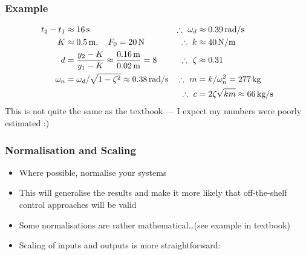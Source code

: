 \documentclass{beamer-control}
\begin{document}
\begin{frame}
\frametitle{Example}
\begin{align}
t_2-t_1&\approx \SI{16}{s} & \therefore~ \omega_d &\approx \SI{0.39}{rad/s} \\
K &\approx \SI{0.5}{m},\quad F_0=\SI{20}{N} & \therefore~ k&\approx \SI{40}{N/m} \\
d&=\frac{y_2-K}{y_1-K}\approx\frac{\SI{0.16}{m}}{\SI{0.02}{m}}=8 & \therefore~ \zeta&\approx0.31  \\
\omega_n &= \omega_d/\sqrt{1-\zeta^2} \approx \SI{0.38}{rad/s} & \therefore~ m &= k/\omega_n^2 = \SI{277}{kg} \\
&& \therefore~c &= 2\zeta\sqrt{km} \approx \SI{66}{kg/s}
\end{align}
This is not quite the same as the textbook --- I expect my numbers were poorly estimated :)

\end{frame}



\begin{frame}
\frametitle{Normalisation and Scaling}
\begin{itemize}
\item Where possible, normalise your systems
\item This will generalise the results and make it more likely that off-the-shelf control approaches will be valid
\item Some normalisations are rather mathematical\dots (see example in textbook)
\item Scaling of inputs and outputs is more straightforward:
\end{itemize}
\end{frame}
\end{document}
